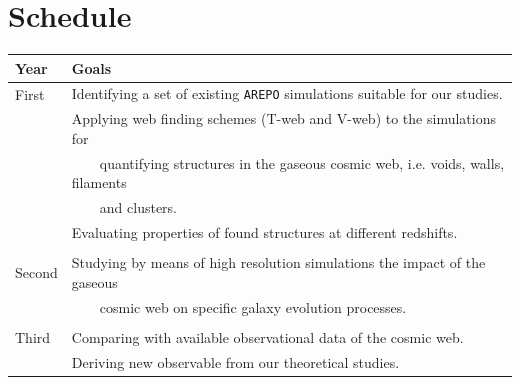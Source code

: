 \documentclass[a4,useAMS,usenatbib,usegraphicx,12pt]{article}
\begin{document}
\section{Schedule}

\begin{table}[h]
\begin{flushleft}
\begin{center}
  \begin{tabular}{l  l} \hline\hline
	\centering\textbf{Year} & \textbf{Goals} \\ \hline
	First  
	& \tabitem Identifying a set of existing \texttt{AREPO} simulations suitable 
	for our studies. \\
	& \tabitem Applying web finding schemes (T-web and V-web) to the simulations 
	for\\
	& \ \ \ \ quantifying structures in the gaseous cosmic web, i.e. voids, walls, 
	filaments\\
	& \ \ \ \ and clusters.\\
	& \tabitem Evaluating properties of found structures at different redshifts.\\
	\\
	Second
	& \tabitem Studying by means of high resolution simulations the impact of the 
	gaseous\\
	& \ \ \ \ cosmic web on specific galaxy evolution processes.\\
	\\	
	Third
	& \tabitem Comparing with available observational data of the cosmic web.\\
	& \tabitem Deriving new observable from our theoretical studies.\\ 
	
	\hline\hline
  \end{tabular}  
\end{center}
\end{flushleft}
\end{table}

\newpage

\renewcommand{\bibname}{8\ \ \ \ Bibliography}
\small

\end{document}
